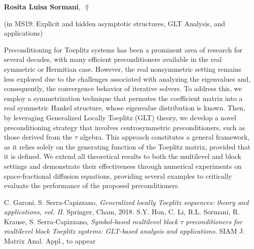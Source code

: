 \documentclass[ILAS2025-program.tex]{subfiles}
\begin{document}
\hypertarget{down0175}{}\begin{ilasabstract}
    
\textbf{Rosita Luisa Sormani},  \hfill \hyperlink{up0175}{$\Uparrow$}
    
    
(in {\color{mstitle}MS19: Explicit and hidden asymptotic structures, GLT Analysis, and applications})
        
\mtskip
    \begin{bibunit}
        Preconditioning for Toeplitz systems has been a prominent area of research for several decades, with many efficient preconditioners available in the real symmetric or Hermitian case. However, the real nonsymmetric setting remains less explored due to the challenges associated with analyzing the eigenvalues and, consequently, the convergence behavior of iterative solvers. To address this, we employ a symmetrization technique that permutes the coefficient matrix into a real symmetric Hankel structure, whose eigenvalue distribution is known. Then, by leveraging Generalized Locally Toeplitz (GLT) theory, we develop a novel preconditioning strategy that involves centrosymmetric preconditioners, such as those derived from the $\tau$ algebra. This approach constitutes a general framework, as it relies solely on the generating function of the Toeplitz matrix, provided that it is defined. We extend all theoretical results to both the multilevel and block settings and demonstrate their effectiveness through numerical experiments on space-fractional diffusion equations, providing several examples to critically evaluate the performance of the proposed preconditioners.

\begin{thebibliography}{2}
C. Garoni, S. Serra-Capizzano, \emph{Generalized locally Toeplitz sequences: theory and applications, vol. II}. Springer, Cham, 2018.
S.Y. Hon, C. Li, R.L. Sormani, R. Krause, S. Serra-Capizzano, \emph{Symbol-based multilevel block $\tau$ preconditioners for multilevel block Toeplitz systems: GLT-based analysis and applications}. SIAM J. Matrix Anal. Appl., to appear
\end{thebibliography}

        \end{bibunit}
        
\end{ilasabstract}
    
\end{document}
